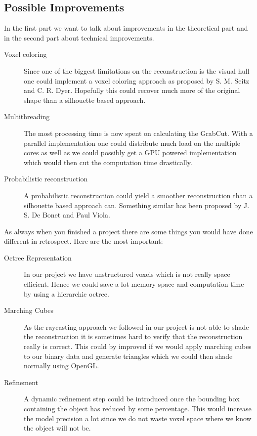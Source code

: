 \documentclass[10pt,twocolumn,letterpaper]{article}
\begin{document}
\subsection{Possible Improvements}

In the first part we want to talk about improvements in the theoretical part and in the second part about technical improvements.

\begin{description}
	\item[Voxel coloring] Since one of the biggest limitations on the reconstruction is the visual hull one could implement a voxel coloring approach as proposed by S. M. Seitz and C. R. Dyer. \cite{Seitz} Hopefully this could recover much more of the original shape than a silhouette based approach.
	\item[Multithreading] The most processing time is now spent on calculating the GrabCut. With a parallel implementation one could distribute much load on the multiple cores as well as we could possibly get a GPU powered implementation which would then cut the computation time drastically.
	\item[Probabilistic reconstruction] A probabilistic reconstruction could yield a smoother reconstruction than a silhouette based approach can. Something similar has  been proposed by J. S. De Bonet and Paul Viola. \cite{Bonet}
\end{description}

As always when you finished a project there are some things you would have done different in retrospect. Here are the most important:

\begin{description}
	\item[Octree Representation] In our project we have unstructured voxels which is not really space efficient. Hence we could save a lot memory space and computation time by using a hierarchic octree.
	\item[Marching Cubes] As the raycasting approach we followed in our project is not able to shade the reconstruction it is sometimes hard to verify that the reconstruction really is correct. This could by improved if we would apply marching cubes to our binary data and generate triangles which we could then shade normally using OpenGL.
	\item[Refinement] A dynamic refinement step could be introduced once the bounding box containing the object has reduced by some percentage. This would increase the model precision a lot since we do not waste voxel space where we know the object will not be.
\end{description}


{\small


}
\end{document}
